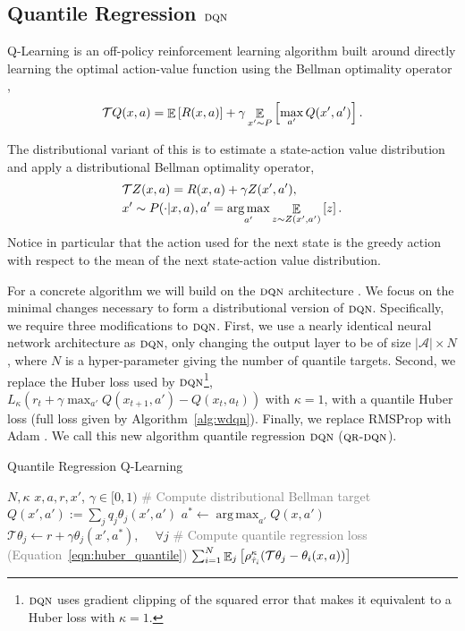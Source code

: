 \documentclass[letterpaper]{article}
\newcommand{\cT}{\mathcal{T}}
\DeclareMathOperator*{\expect}{{\huge \mathbb{E}}}
\DeclareMathOperator*{\argmax}{arg\,max}
\def \dqn {\textsc{dqn}}
\def \qrdqn {\textsc{qr-dqn}}
\begin{document}
\subsection{Quantile Regression $\dqn$}

Q-Learning is an off-policy reinforcement learning algorithm built around directly learning the optimal action-value function using the Bellman optimality operator \cite{watkins1992q},
\begin{equation*}
    \cT Q(x, a) = \expect \left[ R(x, a) \right] + \gamma \expect_{x' \sim P} \left[ \max_{a'} Q(x', a') \right].
\end{equation*}

The distributional variant of this is to estimate a state-action value distribution and apply a distributional Bellman optimality operator,
\begin{eqnarray}
    &\cT Z(x, a) = R(x, a) + \gamma Z(x', a'),\\
    \nonumber &x' \sim P(\cdot|x, a), a' = \argmax_{a'} \expect_{z \sim Z(x', a')} \left[ z \right].
\end{eqnarray}
Notice in particular that the action used for the next state is the greedy action with respect to the mean of the next state-action value distribution.

For a concrete algorithm we will build on the $\dqn$ architecture \cite{mnih15nature}. We focus on the minimal changes necessary to form a distributional version of $\dqn$. Specifically, we require three modifications to $\dqn$. First, we use a nearly identical neural network architecture as $\dqn$, only changing the output layer to be of size $|\mathcal{A}| \times N$, where $N$ is a hyper-parameter giving the number of quantile targets. Second, we replace the Huber loss used by $\dqn$\footnote{$\dqn$ uses gradient clipping of the squared error that makes it equivalent to a Huber loss with $\kappa = 1$.}, $L_{\kappa}(r_t + \gamma \max_{a'} Q(x_{t+1}, a') - Q(x_t, a_t))$ with $\kappa = 1$, with a quantile Huber loss (full loss given by Algorithm~\ref{alg:wdqn}). Finally, we replace RMSProp \cite{tieleman2012lecture} with Adam \cite{kingma2014adam}. We call this new algorithm quantile regression $\dqn$ ($\qrdqn$).


\begin{algorithm}[ht]
\caption{Quantile Regression Q-Learning}\label{alg:wdqn}
\begin{algorithmic}
\REQUIRE $N, \kappa$
\INPUT $x, a, r, x'$, $\gamma \in [0, 1)$
\STATE \textcolor{gray}{\# Compute distributional Bellman target}
\STATE $Q(x', a') := \sum\nolimits_j q_j \theta_j(x', a')$
\STATE $a^* \leftarrow \argmax_{a'} Q(x, a')$
\STATE $\cT \theta_j \leftarrow r + \gamma \theta_j(x', a^*),\ \quad \forall j$
\STATE \textcolor{gray}{\# Compute quantile regression loss (Equation~\ref{eqn:huber_quantile})}
\OUTPUT $\sum_{i=1}^{N} \expect_j \left[ \rho^\kappa_{\hat \tau_i}( \cT \theta_j - \theta_i(x, a)) \right]$
\end{algorithmic}
\end{algorithm}
\end{document}
